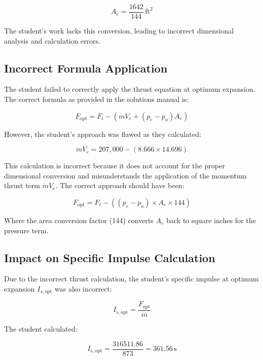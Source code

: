 \documentclass{article}
\begin{document}
\begin{equation}
A_e = \frac{1642}{144} \, \text{ft}^2
\end{equation}

The student's work lacks this conversion, leading to incorrect dimensional analysis and calculation errors.

\subsection{Incorrect Formula Application}

The student failed to correctly apply the thrust equation at optimum expansion. The correct formula as provided in the solutions manual is:

\begin{equation}
F_{\text{opt}} = F_t - (\dot{m} V_e + (p_e - p_a) A_e)
\end{equation}

However, the student's approach was flawed as they calculated:

\begin{equation}
\dot{m} V_e = 207,000 - (8.666 \times 14.696)
\end{equation}

This calculation is incorrect because it does not account for the proper dimensional conversion and misunderstands the application of the momentum thrust term \( \dot{m} V_e \). The correct approach should have been:

\begin{equation}
F_{\text{opt}} = F_t - ((p_e - p_a) \times A_e \times 144)
\end{equation}

Where the area conversion factor (144) converts \( A_e \) back to square inches for the pressure term.

\subsection{Impact on Specific Impulse Calculation}

Due to the incorrect thrust calculation, the student's specific impulse at optimum expansion \( I_{s,\text{opt}} \) was also incorrect:

\begin{equation}
I_{s,\text{opt}} = \frac{F_{\text{opt}}}{\dot{m}}
\end{equation}

The student calculated:

\begin{equation}
I_{s,\text{opt}} = \frac{316511.86}{873} = 361.56 \, \text{s}
\end{equation}
\end{document}
